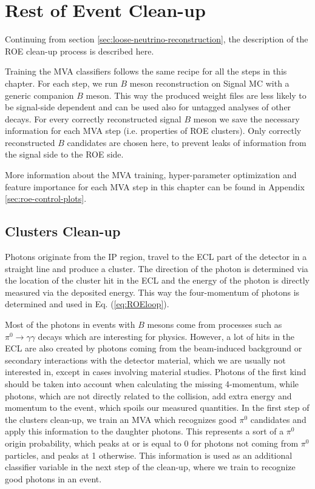 \chapter{Rest of Event Clean-up}
\label{sec:roe}

Continuing from section \ref{sec:loose-neutrino-reconstruction}, the description of the ROE clean-up process is described here. 

Training the MVA classifiers follows the same recipe for all the steps in this chapter. For each step, we run $B$ meson reconstruction on Signal MC with a generic companion $B$ meson. This way the produced weight files are less likely to be signal-side dependent and can be used also for untagged analyses of other decays. For every correctly reconstructed signal $B$ meson we save the necessary information for each MVA step (i.e. properties of ROE clusters). Only correctly reconstructed $B$ candidates are chosen here, to prevent leaks of information from the signal side to the ROE side.

More information about the MVA training, hyper-parameter optimization and feature importance for each MVA step in this chapter can be found in Appendix \ref{sec:roe-control-plots}.

\section{Clusters Clean-up}

Photons originate from the IP region, travel to the ECL part of the detector in a straight line and produce a cluster. The direction of the photon is determined via the location of the cluster hit in the ECL and the energy of the photon is directly measured via the deposited energy. This way the four-momentum of photons is determined and used in Eq. (\ref{eq:ROEloop}).

Most of the photons in events with $B$ mesons come from processes such as $\pi^0 \to \gamma \gamma$ decays which are interesting for physics. However, a lot of hits in the ECL are also created by photons coming from the beam-induced background or secondary interactions with the detector material, which we are usually not interested in, except in cases involving material studies. Photons of the first kind should be taken into account when calculating the missing 4-momentum, while photons, which are not directly related to the collision, add extra energy and momentum to the event, which spoils our measured quantities. In the first step of the clusters clean-up, we train an MVA which recognizes good $\pi^0$ candidates and apply this information to the daughter photons. This represents a sort of a $\pi^0$ origin probability, which peaks at or is equal to 0 for photons not coming from $\pi^0$ particles, and peaks at 1 otherwise. This information is used as an additional classifier variable in the next step of the clean-up, where we train to recognize good photons in an event.

